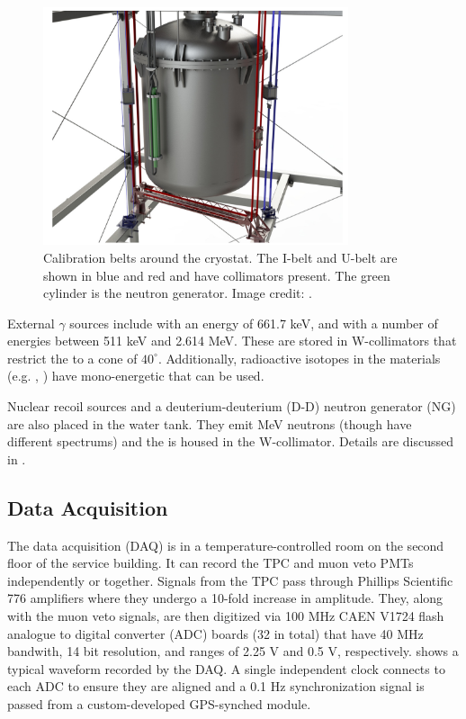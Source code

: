 \begin{figure}
\centering
\includegraphics[width=0.8\textwidth]{TPCCalibrations}
\caption{Calibration belts around the cryostat.  The I-belt and U-belt are shown in blue and red and have collimators present.  The green
cylinder is the neutron generator.  Image credit: .}
\label{fig:xenon1t_calibrations_belts}
\end{figure}

External $\gamma$ sources include  with an energy of 661.7 keV, and  with a number of energies between 511 keV
and 2.614 MeV.  These are stored in W-collimators that restrict the \gammarays to a cone of $40^{\circ}$.  Additionally, radioactive
isotopes in the materials (e.g. , ) have mono-energetic \gammarays that can be used.

Nuclear recoil sources \ambe and a deuterium-deuterium (D-D) neutron generator (NG) are also placed in the water tank.  They emit MeV
neutrons (though have different spectrums) and the \ambe is housed in the W-collimator.  Details are discussed in
.



\subsection{Data Acquisition}
\label{subsec:xenon1t_daq}
The data acquisition (DAQ) is in a temperature-controlled room on the second floor of the service building.  It can record the TPC and
muon veto PMTs independently or together.  Signals from the TPC pass through Phillips Scientific 776 amplifiers
where they undergo a 10-fold increase in amplitude.  They, along with the muon veto signals, are then digitized via 100 MHz CAEN V1724
flash analogue to digital converter (ADC) boards (32 in total) that have 40 MHz bandwith, 14 bit resolution, and ranges of 2.25 V and
0.5 V, respectively.  
shows a typical waveform recorded by the DAQ.  A single independent clock
connects to each ADC to ensure they are aligned and a 0.1 Hz synchronization signal is passed from a custom-developed GPS-synched
module.

